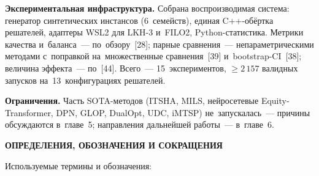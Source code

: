 \documentclass[a4paper,14pt]{extreport}
\newcommand{\sectiontitle}[1]{%
  \begin{center}\textbf{\MakeUppercase{#1}}\end{center}\par\bigskip}
\begin{document}
\medskip
\textbf{Экспериментальная инфраструктура.} Собрана воспроизводимая система: генератор синтетических инстансов (6~семейств), единая C++-обёртка решателей, адаптеры WSL2 для LKH-3 и~FILO2, Python-статистика. Метрики качества и~баланса~--- по~обзору~[28]; парные сравнения~--- непараметрическими методами с~поправкой на~множественные сравнения~[39] и~bootstrap-CI~[38]; величина эффекта~--- по~[44]. Всего~--- 15~экспериментов, $\geq 2\,157$ валидных запусков на~13~конфигурациях решателей.

\textbf{Ограничения.} Часть SOTA-методов (ITSHA, MILS, нейросетевые Equity-Transformer, DPN, GLOP, DualOpt, UDC, iMTSP) не~запускалась~--- причины обсуждаются в~главе~5; направления дальнейшей работы~--- в~главе~6.

\newpage
\renewcommand{\contentsname}{СОДЕРЖАНИЕ}
\tableofcontents

\newpage
{}
\sectiontitle{Определения, обозначения и сокращения}

Используемые термины и обозначения:
\end{document}
